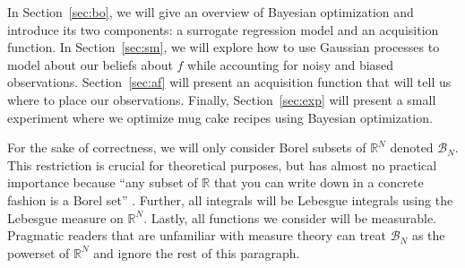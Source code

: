 In Section~\ref{sec:bo}, we will give an overview of Bayesian optimization and introduce its two components: a surrogate regression model and an acquisition function.
In Section~\ref{sec:sm}, we will explore how to use Gaussian processes
to model about our beliefs about $f$ while accounting for noisy and biased observations.
Section~\ref{sec:af} will present an acquisition function that will tell us where to place our observations.
Finally, Section~\ref{sec:exp} will present a small experiment where we optimize mug cake recipes using Bayesian optimization.

For the sake of correctness, we will only consider Borel subsets of $\mathbb{R}^{N}$ denoted $\mathcal{B}_N$.
This restriction is crucial for theoretical purposes, but has almost no practical importance because
 ``any subset of $\mathbb{R}$ that you can write down in a concrete fashion is a Borel set'' \cite{axler2020}.
Further, all integrals will be Lebesgue integrals using the Lebesgue measure on $\mathbb{R}^{N}$.
Lastly, all functions we consider will be measurable.
Pragmatic readers that are unfamiliar with measure theory can treat $\mathcal{B}_N$ as the powerset of $\mathbb{R}^{N}$ and ignore the rest of this paragraph.

